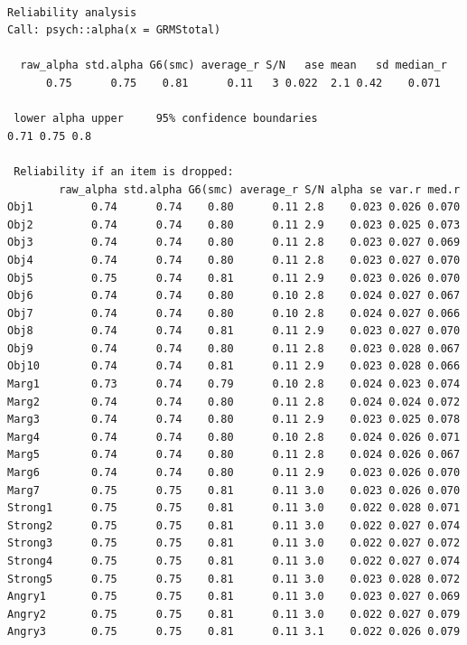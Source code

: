 \documentclass[
  english,
]{book}
\begin{document}
\begin{verbatim}

Reliability analysis   
Call: psych::alpha(x = GRMStotal)

  raw_alpha std.alpha G6(smc) average_r S/N   ase mean   sd median_r
      0.75      0.75    0.81      0.11   3 0.022  2.1 0.42    0.071

 lower alpha upper     95% confidence boundaries
0.71 0.75 0.8 

 Reliability if an item is dropped:
        raw_alpha std.alpha G6(smc) average_r S/N alpha se var.r med.r
Obj1         0.74      0.74    0.80      0.11 2.8    0.023 0.026 0.070
Obj2         0.74      0.74    0.80      0.11 2.9    0.023 0.025 0.073
Obj3         0.74      0.74    0.80      0.11 2.8    0.023 0.027 0.069
Obj4         0.74      0.74    0.80      0.11 2.8    0.023 0.027 0.070
Obj5         0.75      0.74    0.81      0.11 2.9    0.023 0.026 0.070
Obj6         0.74      0.74    0.80      0.10 2.8    0.024 0.027 0.067
Obj7         0.74      0.74    0.80      0.10 2.8    0.024 0.027 0.066
Obj8         0.74      0.74    0.81      0.11 2.9    0.023 0.027 0.070
Obj9         0.74      0.74    0.80      0.11 2.8    0.023 0.028 0.067
Obj10        0.74      0.74    0.81      0.11 2.9    0.023 0.028 0.066
Marg1        0.73      0.74    0.79      0.10 2.8    0.024 0.023 0.074
Marg2        0.74      0.74    0.80      0.11 2.8    0.024 0.024 0.072
Marg3        0.74      0.74    0.80      0.11 2.9    0.023 0.025 0.078
Marg4        0.74      0.74    0.80      0.10 2.8    0.024 0.026 0.071
Marg5        0.74      0.74    0.80      0.11 2.8    0.024 0.026 0.067
Marg6        0.74      0.74    0.80      0.11 2.9    0.023 0.026 0.070
Marg7        0.75      0.75    0.81      0.11 3.0    0.023 0.026 0.070
Strong1      0.75      0.75    0.81      0.11 3.0    0.022 0.028 0.071
Strong2      0.75      0.75    0.81      0.11 3.0    0.022 0.027 0.074
Strong3      0.75      0.75    0.81      0.11 3.0    0.022 0.027 0.072
Strong4      0.75      0.75    0.81      0.11 3.0    0.022 0.027 0.074
Strong5      0.75      0.75    0.81      0.11 3.0    0.023 0.028 0.072
Angry1       0.75      0.75    0.81      0.11 3.0    0.023 0.027 0.069
Angry2       0.75      0.75    0.81      0.11 3.0    0.022 0.027 0.079
Angry3       0.75      0.75    0.81      0.11 3.1    0.022 0.026 0.079


\end{verbatim}
\end{document}
